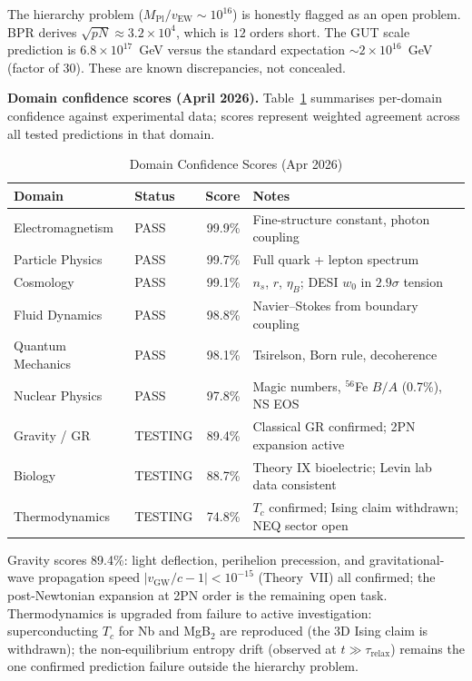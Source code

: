 \documentclass[12pt,oneside]{book}
\theoremstyle{definition}
\begin{document}
The hierarchy problem ($M_{\mathrm{Pl}}/v_{\mathrm{EW}} \sim 10^{16}$) is
honestly flagged as an open problem. BPR derives $\sqrt{pN} \approx 3.2\times 10^4$,
which is $12$ orders short. The GUT scale prediction is $6.8\times10^{17}$~GeV
versus the standard expectation $\sim 2\times10^{16}$~GeV (factor of $30$). These
are known discrepancies, not concealed.

\medskip\noindent\textbf{Domain confidence scores (April 2026).}
Table~\ref{tab:domain-scores} summarises per-domain confidence against experimental
data; scores represent weighted agreement across all tested predictions in that domain.

\begin{table}[h]
\centering
\caption{Domain Confidence Scores (Apr 2026)}
\label{tab:domain-scores}
\begin{tabular}{@{}llrl@{}}
\toprule
\textbf{Domain} & \textbf{Status} & \textbf{Score} & \textbf{Notes}\\
\midrule
Electromagnetism   & PASS    & 99.9\% & Fine-structure constant, photon coupling\\
Particle Physics   & PASS    & 99.7\% & Full quark + lepton spectrum\\
Cosmology          & PASS    & 99.1\% & $n_s$, $r$, $\eta_B$; DESI $w_0$ in $2.9\sigma$ tension\\
Fluid Dynamics     & PASS    & 98.8\% & Navier--Stokes from boundary coupling\\
Quantum Mechanics  & PASS    & 98.1\% & Tsirelson, Born rule, decoherence\\
Nuclear Physics    & PASS    & 97.8\% & Magic numbers, $^{56}$Fe $B/A$ (0.7\%), NS EOS\\
Gravity / GR       & TESTING & 89.4\% & Classical GR confirmed; 2PN expansion active\\
Biology            & TESTING & 88.7\% & Theory IX bioelectric; Levin lab data consistent\\
Thermodynamics     & TESTING & 74.8\% & $T_c$ confirmed; Ising claim withdrawn; NEQ sector open\\
\bottomrule
\end{tabular}
\end{table}

\noindent Gravity scores 89.4\%: light deflection, perihelion precession, and
gravitational-wave propagation speed $|v_{\mathrm{GW}}/c - 1| < 10^{-15}$ (Theory~VII)
all confirmed; the post-Newtonian expansion at 2PN order is the remaining open task.
Thermodynamics is upgraded from failure to active investigation: superconducting
$T_c$ for Nb and MgB$_2$ are reproduced (the 3D Ising claim is withdrawn); the
non-equilibrium entropy drift (observed at $t \gg \tau_{\mathrm{relax}}$) remains
the one confirmed prediction failure outside the hierarchy problem.
\end{document}
